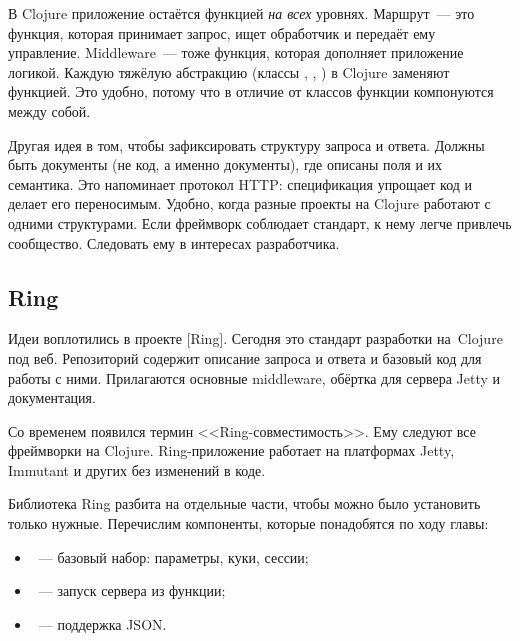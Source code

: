 \label{http-all-function}

В Clojure приложение остаётся функцией \emph{на всех} уровнях. Маршрут~--- это
функция, которая принимает запрос, ищет обработчик и передаёт ему
управление. Middleware~--- тоже функция, которая дополняет приложение
логикой. Каждую тяжёлую абстракцию (классы , ,
) в Clojure заменяют функцией. Это удобно, потому что в отличие от
классов функции компонуются между собой.

Другая идея в том, чтобы зафиксировать структуру запроса и ответа. Должны быть
документы (не код, а именно документы), где описаны поля и их семантика. Это
напоминает протокол HTTP: спецификация упрощает код и делает его
переносимым. Удобно, когда разные проекты на Clojure работают с одними
структурами. Если фреймворк соблюдает стандарт, к нему легче привлечь
сообщество. Следовать ему в интересах разработчика.

\subsection{Ring}

\label{ring-jetty}

Идеи воплотились в проекте [Ring].
Сегодня это стандарт разработки на~Clojure под веб. Репозиторий содержит описание
запроса и ответа и базовый код для работы с ними. Прилагаются основные middleware,
обёртка для сервера Jetty и документация.


Со временем появился термин <<Ring-совмести\-мость>>. Ему следуют все фреймворки
на Clojure. Ring-приложение работает на платформах Jetty, Immutant и других без
изменений в коде.

Библиотека Ring разбита на отдельные части, чтобы можно было установить только
нужные. Перечислим компоненты, которые понадобятся по ходу главы:

\begin{itemize}

\item
  ~--- базовый набор: параметры, куки, сессии;

\item
  ~--- запуск сервера из функции;

\item
  ~--- поддержка JSON.

\end{itemize}

